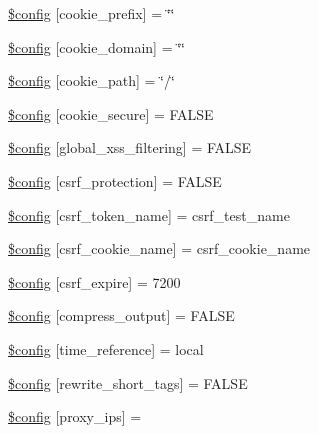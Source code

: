 \begin{DoxyCompactItemize}
\item 
\hyperlink{ci_2application_2config_2config_8php_ae5f35eb62ffdcfa1878ed13fa47b2d5d}{\$config} \mbox{[}\textquotesingle{}cookie\+\_\+prefix\textquotesingle{}\mbox{]} = \char`\"{}\char`\"{}
\item 
\hyperlink{ci_2application_2config_2config_8php_a4f967865afe18263372e9c66223a752e}{\$config} \mbox{[}\textquotesingle{}cookie\+\_\+domain\textquotesingle{}\mbox{]} = \char`\"{}\char`\"{}
\item 
\hyperlink{ci_2application_2config_2config_8php_aeadefdcde429770b04a079e002194d2f}{\$config} \mbox{[}\textquotesingle{}cookie\+\_\+path\textquotesingle{}\mbox{]} = \char`\"{}/\char`\"{}
\item 
\hyperlink{ci_2application_2config_2config_8php_a7d66abd075b76c2fdcd0837068a13b51}{\$config} \mbox{[}\textquotesingle{}cookie\+\_\+secure\textquotesingle{}\mbox{]} = F\+A\+L\+SE
\item 
\hyperlink{ci_2application_2config_2config_8php_afee3589eecfa5ebecf39f44c271d58ce}{\$config} \mbox{[}\textquotesingle{}global\+\_\+xss\+\_\+filtering\textquotesingle{}\mbox{]} = F\+A\+L\+SE
\item 
\hyperlink{ci_2application_2config_2config_8php_a37f959c7a92cefa11c0df7db2b83c89f}{\$config} \mbox{[}\textquotesingle{}csrf\+\_\+protection\textquotesingle{}\mbox{]} = F\+A\+L\+SE
\item 
\hyperlink{ci_2application_2config_2config_8php_af0e5ccff5383b00a56f4ad3ee0d289d2}{\$config} \mbox{[}\textquotesingle{}csrf\+\_\+token\+\_\+name\textquotesingle{}\mbox{]} = \textquotesingle{}csrf\+\_\+test\+\_\+name\textquotesingle{}
\item 
\hyperlink{ci_2application_2config_2config_8php_ad8f36090649afb3101c3c337c1d722a1}{\$config} \mbox{[}\textquotesingle{}csrf\+\_\+cookie\+\_\+name\textquotesingle{}\mbox{]} = \textquotesingle{}csrf\+\_\+cookie\+\_\+name\textquotesingle{}
\item 
\hyperlink{ci_2application_2config_2config_8php_af5c0ea7b77c40439da4f23b7cbb9c2e4}{\$config} \mbox{[}\textquotesingle{}csrf\+\_\+expire\textquotesingle{}\mbox{]} = 7200
\item 
\hyperlink{ci_2application_2config_2config_8php_a5f03a6c067b921917c2d978f4991bcd1}{\$config} \mbox{[}\textquotesingle{}compress\+\_\+output\textquotesingle{}\mbox{]} = F\+A\+L\+SE
\item 
\hyperlink{ci_2application_2config_2config_8php_acb20698e35bc3d4b9692a4b4619b1b05}{\$config} \mbox{[}\textquotesingle{}time\+\_\+reference\textquotesingle{}\mbox{]} = \textquotesingle{}local\textquotesingle{}
\item 
\hyperlink{ci_2application_2config_2config_8php_a5d2e2b3f3030d1bd97f6d986ef13ace9}{\$config} \mbox{[}\textquotesingle{}rewrite\+\_\+short\+\_\+tags\textquotesingle{}\mbox{]} = F\+A\+L\+SE
\item 
\hyperlink{ci_2application_2config_2config_8php_a99ce814cf767ce4e281380e6f2158b1b}{\$config} \mbox{[}\textquotesingle{}proxy\+\_\+ips\textquotesingle{}\mbox{]} = \textquotesingle{}\textquotesingle{}
\end{DoxyCompactItemize}


